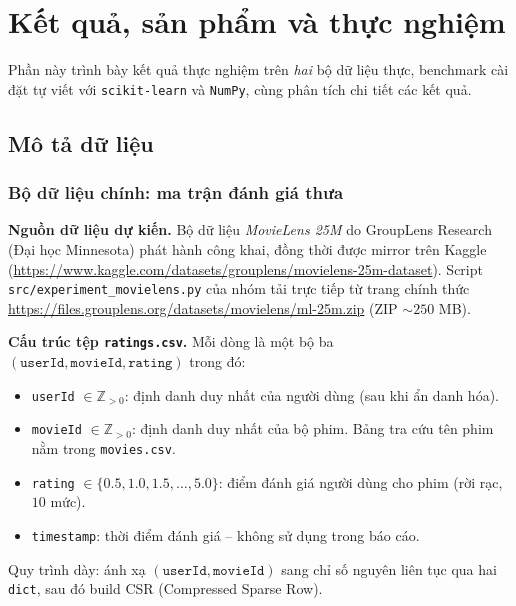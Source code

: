 \section{Kết quả, sản phẩm và thực nghiệm}\label{sec:experiments}

Phần này trình bày kết quả thực nghiệm trên \emph{hai} bộ dữ liệu thực,
benchmark cài đặt tự viết với \texttt{scikit-learn} và \texttt{NumPy}, cùng
phân tích chi tiết các kết quả.

\subsection{Mô tả dữ liệu}\label{subsec:data}

\subsubsection{Bộ dữ liệu chính: ma trận đánh giá thưa}\label{subsubsec:movielens}

\textbf{Nguồn dữ liệu dự kiến.} Bộ dữ liệu \emph{MovieLens 25M} do GroupLens
Research (Đại học Minnesota) phát hành công khai, đồng thời được mirror trên
Kaggle (\url{https://www.kaggle.com/datasets/grouplens/movielens-25m-dataset}).
Script \texttt{src/experiment\_movielens.py} của nhóm tải trực tiếp từ trang
chính thức \url{https://files.grouplens.org/datasets/movielens/ml-25m.zip}
(ZIP $\sim 250$ MB).

\textbf{Cấu trúc tệp \texttt{ratings.csv}.} Mỗi dòng là một bộ ba
$(\texttt{userId}, \texttt{movieId}, \texttt{rating})$ trong đó:
\begin{itemize}
    \item \texttt{userId} $\in \mathbb{Z}_{>0}$: định danh duy nhất của
    người dùng (sau khi ẩn danh hóa).
    \item \texttt{movieId} $\in \mathbb{Z}_{>0}$: định danh duy nhất của
    bộ phim. Bảng tra cứu tên phim nằm trong \texttt{movies.csv}.
    \item \texttt{rating} $\in \{0.5, 1.0, 1.5, \dots, 5.0\}$: điểm đánh
    giá người dùng cho phim (rời rạc, $10$ mức).
    \item \texttt{timestamp}: thời điểm đánh giá -- không sử dụng trong báo cáo.
\end{itemize}
Quy trình dày: ánh xạ $(\texttt{userId}, \texttt{movieId})$ sang chỉ số nguyên
liên tục qua hai \texttt{dict}, sau đó build CSR (Compressed Sparse Row).

